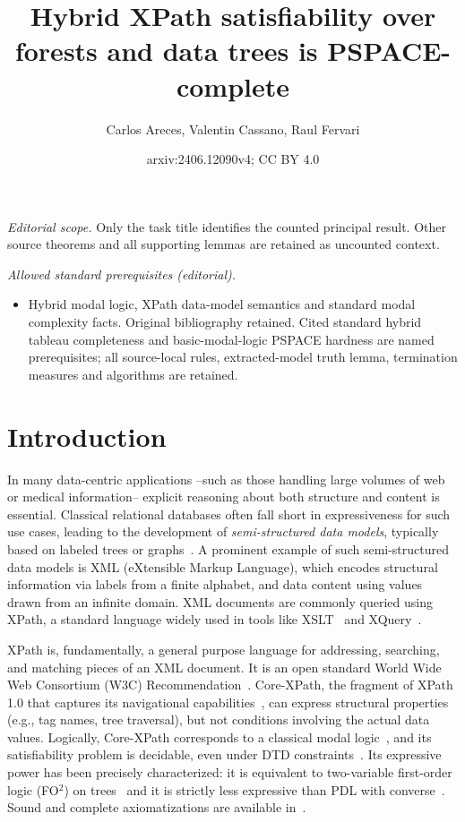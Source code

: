 \documentclass[10pt,a4paper]{amsart}
\title{Hybrid XPath satisfiability over forests and data trees is PSPACE-complete}
\author{Carlos Areces, Valentin Cassano, Raul Fervari}
\date{arxiv:2406.12090v4; CC BY 4.0}
\theoremstyle{definition}
\theoremstyle{remark}
\begin{document}
\maketitle
\noindent\textit{Editorial scope.} Only the task title identifies the counted principal result. Other source theorems and all supporting lemmas are retained as uncounted context.\par\medskip
\noindent\textit{Allowed standard prerequisites (editorial).}\begin{itemize}
\item Hybrid modal logic, XPath data-model semantics and standard modal complexity facts. Original bibliography retained. Cited standard hybrid tableau completeness and basic-modal-logic PSPACE hardness are named prerequisites; all source-local rules, extracted-model truth lemma, termination measures and algorithms are retained.
\end{itemize}\medskip
\section{Introduction}
\label{sec:intro}


In many data-centric applications --such as those handling large volumes of web or medical information-- explicit reasoning about both structure and content is essential. Classical relational databases often fall short in expressiveness for such use cases, leading to the development of \emph{semi-structured data models}, typically based on labeled trees or graphs~\cite{Bune:semi97,Abit:data99}. A prominent example of such semi-structured data models is XML (eXtensible Markup Language), which encodes structural information via labels from a finite alphabet, and data content using values drawn from an infinite domain. XML documents are commonly queried using XPath, a standard language widely used in tools like XSLT~\cite{xslt:w3c} and XQuery~\cite{xquery:w3c}.  

XPath is, fundamentally, a general purpose language for
addressing, searching, and matching pieces of an XML document. It is an open standard
World Wide Web Consortium (W3C) Recommendation~\cite{xpath:w3c}.
Core-XPath, the fragment of XPath 1.0 that captures its navigational capabilities~\cite{GKP05}, can express structural properties (e.g., tag names, tree traversal), but not conditions involving the actual data values. Logically, Core-XPath corresponds to a classical modal logic~\cite{blackburn2001modal,blackburn06}, and its satisfiability problem is decidable, even under DTD constraints~\cite{M04,BFG08}. Its expressive power has been precisely characterized: it is equivalent to two-variable first-order logic (FO$^2$) on trees~\cite{MdR05} and it is strictly less expressive than PDL with converse~\cite{BK08}. Sound and complete axiomatizations are available in~\cite{CateM09,cateLM10}.
\end{document}
